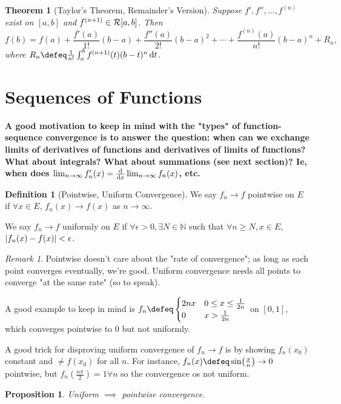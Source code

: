 \documentclass[12pt, oneside]{article}
\theoremstyle{definition}
\newtheorem{defn}{Definition}
\theoremstyle{plain}
\newtheorem{thm}{Theorem}
\newtheorem{prop}{Proposition}
\theoremstyle{remark}
\newtheorem{remark}{Remark}
\let\origsection=\section
\renewcommand\section[1]{\origsection{#1}\label{sec:\thesection}}
\begin{document}
\begin{thm}[Taylor's Theorem, Remainder's Version]
  Suppose $f', f'', \dots, f^{(n)}$ exist on $[a, b]$ and $f^{(n+1)} \in \mathcal{R}[a, b]$. Then \[
  f(b) = f(a) + \frac{f'(a)}{1!}(b-a) + \frac{f''(a)}{2!}(b-a)^2 + \cdots + \frac{f^{(n)}(a)}{n!}(b-a)^n + R_n,
  \]
  where $R_n \defeq \frac{1}{n!} \int_a^b f^{(n+1)}(t) (b - t)^{n} \dd{t}$.
\end{thm}

\section{Sequences of Functions}

\textbf{A good motivation to keep in mind with the "types" of function-sequence convergence is to answer the question: when can we exchange limits of derivatives of functions and derivatives of limits of functions? What about integrals? What about summations (see next section)? Ie, when does $\lim_{n \to \infty} f_n'(x) = \dv{x}\lim_{n \to \infty} f_n(x)$, etc.}

\begin{defn}[Pointwise, Uniform Convergence]
We say $f_n \to f$ pointwise on $E$ if $\forall x \in E$, $f_n(x) \to f(x)$ as $n \to \infty$.

We say $f_n \to f$ uniformly on $E$ if $\forall \epsilon > 0, \exists N \in \mathbb{N}$ such that $\forall n \geq N, x \in E$, $\abs{f_n(x) - f(x)} < \epsilon$.
\end{defn}

\begin{remark}
Pointwise doesn't care about the "rate of convergence"; as long as each point converges eventually, we're good. Uniform convergence needs all points to converge "at the same rate" (so to speak).

A good example to keep in mind is $f_n \defeq \begin{cases}
  2nx & 0 \leq x \leq \frac{1}{2n}\\
  0 & x > \frac{1}{2n}
\end{cases}$ on $[0, 1]$, which converges pointwise to $0$ but not uniformly.

A good trick for disproving uniform convergence of $f_n \to f$ is by showing $f_n(x_0)$ constant and $\neq f(x_0)$ for all $n$. For instance, $f_n(x) \defeq \sin(\frac{x}{n}) \to 0$ pointwise, but $f_n(\frac{n\pi}{2}) = 1 \forall n$ so the convergence os not uniform.
\end{remark}
\begin{prop}
  Uniform $\implies$ pointwise convergence.
\end{prop}
\end{document}
